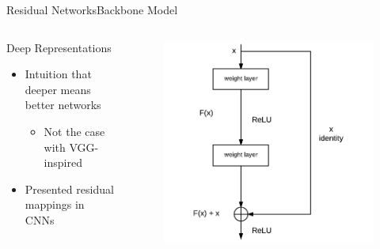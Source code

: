 \begin{frame}{Residual Networks}{Backbone Model}
\begin{columns}
        \begin{block}{Deep Representations}
        \begin{itemize}
            \item Intuition that deeper means better networks
            \begin{itemize}
                \item Not the case with VGG-inspired
            \end{itemize}
            \item Presented residual mappings in CNNs
        \end{itemize}
    \end{block}
        \begin{figure}
            \includegraphics[width=1.0 \textwidth]{figs/resblock.pdf}
        \end{figure}
    \end{columns}
\end{frame}

